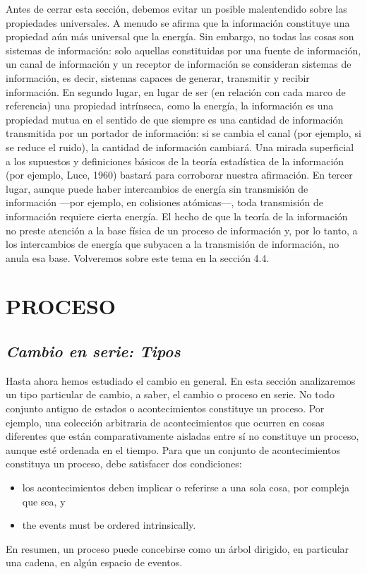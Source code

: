 \begin{justifying}
    Antes de cerrar esta sección, debemos evitar un posible malentendido sobre las propiedades universales. A menudo se afirma que la información constituye una propiedad aún más universal que la energía. Sin embargo, no todas 
    las cosas son sistemas de información: solo aquellas constituidas por una fuente de información, un canal de información y un receptor de información se consideran sistemas de información, es decir, sistemas capaces de generar, 
    transmitir y recibir información. En segundo lugar, en lugar de ser (en relación con cada marco de referencia) una propiedad intrínseca, como la energía, la información es una propiedad mutua en el sentido de que siempre es una 
    cantidad de información transmitida por un portador de información: si se cambia el canal (por ejemplo, si se reduce el ruido), la cantidad de información cambiará. Una mirada superficial a los supuestos y definiciones básicos 
    de la teoría estadística de la información (por ejemplo, Luce, 1960) bastará para corroborar nuestra afirmación. En tercer lugar, aunque puede haber intercambios de energía sin transmisión de información —por ejemplo, en colisiones 
    atómicas—, toda transmisión de información requiere cierta energía. El hecho de que la teoría de la información no preste atención a la base física de un proceso de información y, por lo tanto, a los intercambios de energía que 
    subyacen a la transmisión de información, no anula esa base. Volveremos sobre este tema en la sección 4.4.
    \section{\centering \large PROCESO}
	\subsection{\textit{Cambio en serie: Tipos}}
    Hasta ahora hemos estudiado el cambio en general. En esta sección analizaremos un tipo particular de cambio, a saber, el cambio o proceso en serie. No todo conjunto antiguo de estados o acontecimientos constituye un proceso. Por ejemplo, 
    una colección arbitraria de acontecimientos que ocurren en cosas diferentes que están comparativamente aisladas entre sí no constituye un proceso, aunque esté ordenada en el tiempo. Para que un conjunto de acontecimientos constituya un proceso, 
    debe satisfacer dos condiciones:
    \begin{itemize}
        \item[(i)] los acontecimientos deben implicar o referirse a una sola cosa, por compleja que sea, y   
        \item[(ii)] the events must be ordered intrinsically.
    \end{itemize}
    En resumen, un proceso puede concebirse como un árbol dirigido, en particular una cadena, en algún espacio de eventos.


\end{justifying}
